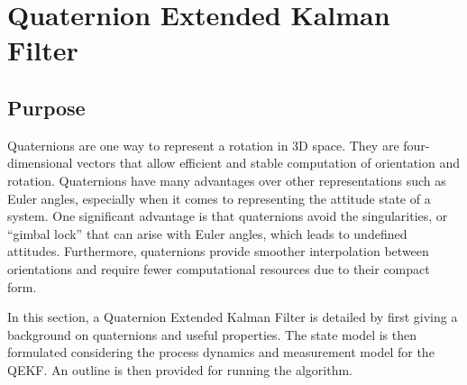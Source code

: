 \section{Quaternion Extended Kalman Filter}
\subsection{Purpose}
Quaternions are one way to represent a rotation in 3D space. They are four-dimensional vectors that allow efficient and stable computation of orientation and rotation. Quaternions have many advantages over other representations such as Euler angles, especially when it comes to representing the attitude state of a system. One significant advantage is that quaternions avoid the singularities, or ``gimbal lock'' \cite{7868509} that can arise with Euler angles, which leads to undefined attitudes. Furthermore, quaternions provide smoother interpolation between orientations and require fewer computational resources due to their compact form.

In this section, a Quaternion Extended Kalman Filter is detailed by first giving a background on quaternions and useful properties. The state model is then formulated considering the process dynamics and measurement model for the QEKF. An outline is then provided for running the algorithm.
